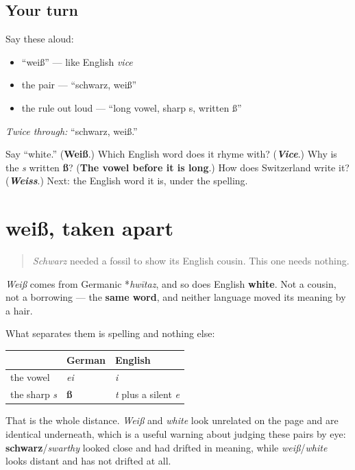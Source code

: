 \subsection*{Your turn}
Say these aloud:

\begin{itemize}
\raggedright
  \item \textquotedblleft{}weiß\textquotedblright{} — like English \emph{vice}
  \item the pair — \textquotedblleft{}schwarz, weiß\textquotedblright{}
  \item the rule out loud — \textquotedblleft{}long vowel, sharp s, written ß\textquotedblright{}
\end{itemize}

\emph{Twice through:} \textquotedblleft{}schwarz, weiß.\textquotedblright{}

\begin{tcolorbox}[breakable,colback=teal!4,colframe=teal!35!black,title={Before you move on}]
Say \textquotedblleft{}white.\textquotedblright{} (\textbf{Weiß}.) Which English word does it rhyme with? (\emph{\textbf{Vice}}.) Why is the \emph{s} written \textbf{ß}? (\textbf{The vowel before it is long}.) How does Switzerland write it? (\emph{\textbf{Weiss}}.) Next: the English word it is, under the spelling.
\end{tcolorbox}
\section[weiß und white]{weiß, taken apart}

\label{lesson:GE-C13-weiss-white}



\begin{quote}
\emph{Schwarz} needed a fossil to show its English cousin. This one needs nothing.
\end{quote}

\begin{cousinweb}
\emph{Weiß} comes from Germanic *\emph{hwītaz}, and so does English \textbf{white}. Not a cousin, not a borrowing — the \textbf{same word}, and neither language moved its meaning by a hair.

What separates them is spelling and nothing else:

\noindent
\begin{tabularx}{\linewidth}{@{}>{\raggedright\arraybackslash}X>{\raggedright\arraybackslash}X>{\raggedright\arraybackslash}X@{}}
\toprule
\textbf{} & \textbf{German} & \textbf{English} \\
\midrule
the vowel & \emph{ei} & \emph{i} \\
the sharp \emph{s} & \textbf{ß} & \emph{t} plus a silent \emph{e} \\
\bottomrule
\end{tabularx}

That is the whole distance. \emph{Weiß} and \emph{white} look unrelated on the page and are identical underneath, which is a useful warning about judging these pairs by eye: \textbf{schwarz}/\emph{swarthy} looked close and had drifted in meaning, while \emph{weiß}/\emph{white} looks distant and has not drifted at all.
\end{cousinweb}

